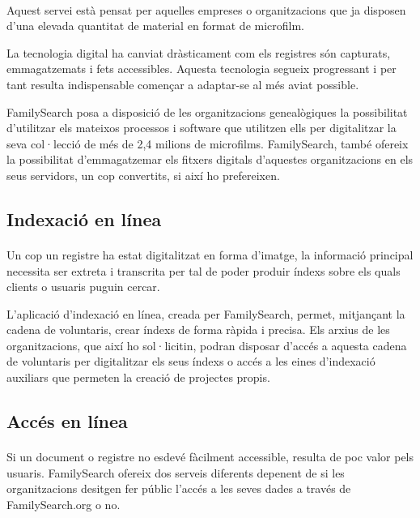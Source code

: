     \paragraph{}
    Aquest servei està pensat per aquelles empreses o organitzacions que ja disposen d’una elevada quantitat de material en format de microfilm.

    La tecnologia digital ha canviat dràsticament com els registres són capturats, emmagatzemats i fets accessibles. Aquesta tecnologia segueix progressant i per tant resulta indispensable començar a adaptar-se al més aviat possible.

    FamilySearch posa a disposició de les organitzacions genealògiques la possibilitat d’utilitzar els mateixos processos i software que utilitzen ells per digitalitzar la seva col·lecció de més de 2,4 milions de microfilms. FamilySearch, també ofereix la possibilitat d’emmagatzemar els fitxers digitals d’aquestes organitzacions en els seus servidors, un cop convertits, si així ho prefereixen.


    \subsection{Indexació en línea}

    \paragraph{}
    Un cop un registre ha estat digitalitzat en forma d’imatge, la informació principal necessita ser extreta i transcrita per tal de poder produir índexs sobre els quals clients o usuaris puguin cercar.

    L’aplicació d’indexació en línea, creada per FamilySearch, permet, mitjançant la cadena de voluntaris, crear índexs de forma ràpida i precisa. Els arxius de les organitzacions, que així ho sol·licitin, podran disposar d’accés a aquesta cadena de voluntaris per digitalitzar els seus índexs o accés a les eines d’indexació auxiliars  que permeten la creació de projectes propis.


    \subsection{Accés en línea}

    \paragraph{}
    Si un document o registre no esdevé fàcilment accessible, resulta de poc valor pels usuaris. FamilySearch ofereix dos serveis diferents depenent de si les organitzacions desitgen fer públic l'accés a les seves dades a través de FamilySearch.org o no.

